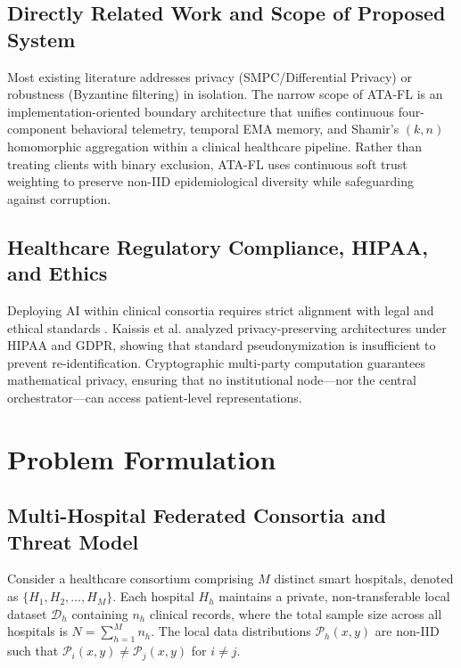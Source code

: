 \documentclass[conference]{IEEEtran}
\begin{document}
\subsection{Directly Related Work and Scope of Proposed System}
Most existing literature addresses privacy (SMPC/Differential Privacy) or robustness (Byzantine filtering) in isolation. The narrow scope of ATA-FL is an implementation-oriented boundary architecture that unifies continuous four-component behavioral telemetry, temporal EMA memory, and Shamir's $(k, n)$ homomorphic aggregation within a clinical healthcare pipeline. Rather than treating clients with binary exclusion, ATA-FL uses continuous soft trust weighting to preserve non-IID epidemiological diversity while safeguarding against corruption.

\subsection{Healthcare Regulatory Compliance, HIPAA, and Ethics}
Deploying AI within clinical consortia requires strict alignment with legal and ethical standards \cite{rieke2020future, kaissis2020secure}. Kaissis et al. \cite{kaissis2020secure} analyzed privacy-preserving architectures under HIPAA and GDPR, showing that standard pseudonymization is insufficient to prevent re-identification. Cryptographic multi-party computation guarantees mathematical privacy, ensuring that no institutional node---nor the central orchestrator---can access patient-level representations.

\section{Problem Formulation}

\subsection{Multi-Hospital Federated Consortia and Threat Model}
Consider a healthcare consortium comprising $M$ distinct smart hospitals, denoted as $\{H_1, H_2, \dots, H_M\}$. Each hospital $H_h$ maintains a private, non-transferable local dataset $\mathcal{D}_h$ containing $n_h$ clinical records, where the total sample size across all hospitals is $N = \sum_{h=1}^M n_h$. The local data distributions $\mathcal{P}_h(x, y)$ are non-IID such that $\mathcal{P}_i(x, y) \neq \mathcal{P}_j(x, y)$ for $i \neq j$.
\end{document}
